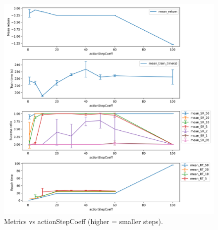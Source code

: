 \documentclass{article}
\begin{document}
\begin{figure}[H]
    \centering
    \includegraphics[width=\textwidth]{../actionStepCoeff.png}
\caption{Metrics vs actionStepCoeff (higher = smaller steps).}
\end{figure}
\end{document}
